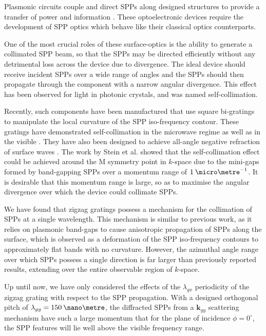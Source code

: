 Plasmonic circuits couple and direct SPPs along designed structures to provide a transfer of power and information \cite{Ozbay2006a,Zayats2005}. These optoelectronic devices require the development of SPP optics which behave like their classical optics counterparts.

One of the most crucial roles of these surface-optics is the ability to generate a collimated SPP beam, so that the SPPs may be directed efficiently without any detrimental loss across the device due to divergence. The ideal device should receive incident SPPs over a wide range of angles and the SPPs should then propagate through the component with a narrow angular divergence. This effect has been observed for light in photonic crystals, and was named self-collimation. \cite{Ogawa2005,Kosaka1999}

Recently, such components have been manufactured that use square bi-gratings to manipulate the local curvature of the SPP iso-frequency contour. These gratings have demonstrated self-collimation in the microwave regime \cite{Kim2011} as well as in the visible \cite{Stein2012}. They  have also been designed to achieve all-angle negative refraction of surface waves \cite{Luo2002, Ruan2006}. The work by Stein et al. \cite{Stein2012} showed that the self-collimation effect could be achieved around the M symmetry point in $k$-space due to the mini-gaps formed by band-gapping SPPs over a momentum range of $1\:\micro\metre^{-1}$. It is desirable that this momentum range is large, so as to maximise the angular divergence over which the device could collimate SPPs.

We have found that zigzag gratings possess a mechanism for the collimation of SPPs at a single wavelength. This mechanism is similar to previous work, as it  relies on plasmonic band-gaps to cause anisotropic propagation of SPPs along the surface, which is observed as a deformation of the SPP iso-frequency contours to approximately flat bands with no curvature. However, the azimuthal angle range over which SPPs possess a single direction is far larger than previously reported results, extending over the entire observable region of $k$-space.

Up until now, we have only considered the effects of the $\lambda_{gx}$ periodicity of the zigzag grating with respect to the SPP propagation. With a designed orthogonal pitch of $\lambda_{gy}=150\:\nano\metre$, the diffracted SPPs from a $\mathbf{k}_{gy}$ scattering mechanism have such a large momentum that for the plane of incidence $\phi=0^\circ$, the SPP features will lie well above the visible frequency range. 

